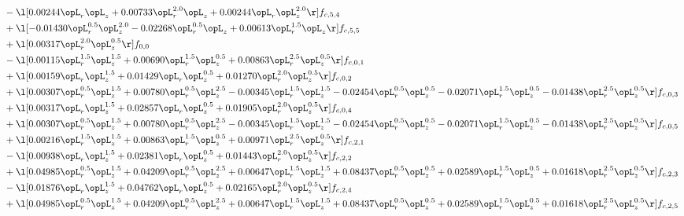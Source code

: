 \begin{alignat}{2}
& - \l[  0.00244 \opL_r \opL_z +  0.00733 \opL_r^{2.0} \opL_z +  0.00244 \opL_r \opL_z^{2.0}  \r] f_{c,5,4} \nonumber \\ 
& + \l[  -0.01430 \opL_r^{0.5} \opL_z^{2.0}   -0.02268 \opL_r^{0.5} \opL_z +  0.00613 \opL_r^{1.5} \opL_z  \r] f_{c,5,5} \nonumber \\ 
& + \l[  0.00317 \opL_r^{2.0} \opL_z^{0.5}  \r] f_{0,0} \nonumber \\ 
& - \l[  0.00115 \opL_r^{1.5} \opL_z^{1.5} +  0.00690 \opL_r^{1.5} \opL_z^{0.5} +  0.00863 \opL_r^{2.5} \opL_z^{0.5}  \r] f_{c,0,1} \nonumber \\ 
& + \l[  0.00159 \opL_r \opL_z^{1.5} +  0.01429 \opL_r \opL_z^{0.5} +  0.01270 \opL_r^{2.0} \opL_z^{0.5}  \r] f_{c,0,2} \nonumber \\ 
& + \l[  0.00307 \opL_r^{0.5} \opL_z^{1.5} +  0.00780 \opL_r^{0.5} \opL_z^{2.5}   -0.00345 \opL_r^{1.5} \opL_z^{1.5}   -0.02454 \opL_r^{0.5} \opL_z^{0.5}   -0.02071 \opL_r^{1.5} \opL_z^{0.5}   -0.01438 \opL_r^{2.5} \opL_z^{0.5}  \r] f_{c,0,3} \nonumber \\ 
& + \l[  0.00317 \opL_r \opL_z^{1.5} +  0.02857 \opL_r \opL_z^{0.5} +  0.01905 \opL_r^{2.0} \opL_z^{0.5}  \r] f_{c,0,4} \nonumber \\ 
& + \l[  0.00307 \opL_r^{0.5} \opL_z^{1.5} +  0.00780 \opL_r^{0.5} \opL_z^{2.5}   -0.00345 \opL_r^{1.5} \opL_z^{1.5}   -0.02454 \opL_r^{0.5} \opL_z^{0.5}   -0.02071 \opL_r^{1.5} \opL_z^{0.5}   -0.01438 \opL_r^{2.5} \opL_z^{0.5}  \r] f_{c,0,5} \nonumber \\ 
& + \l[  0.00216 \opL_r^{1.5} \opL_z^{1.5} +  0.00863 \opL_r^{1.5} \opL_z^{0.5} +  0.00971 \opL_r^{2.5} \opL_z^{0.5}  \r] f_{c,2,1} \nonumber \\ 
& - \l[  0.00938 \opL_r \opL_z^{1.5} +  0.02381 \opL_r \opL_z^{0.5} +  0.01443 \opL_r^{2.0} \opL_z^{0.5}  \r] f_{c,2,2} \nonumber \\ 
& + \l[  0.04985 \opL_r^{0.5} \opL_z^{1.5} +  0.04209 \opL_r^{0.5} \opL_z^{2.5} +  0.00647 \opL_r^{1.5} \opL_z^{1.5} +  0.08437 \opL_r^{0.5} \opL_z^{0.5} +  0.02589 \opL_r^{1.5} \opL_z^{0.5} +  0.01618 \opL_r^{2.5} \opL_z^{0.5}  \r] f_{c,2,3} \nonumber \\ 
& - \l[  0.01876 \opL_r \opL_z^{1.5} +  0.04762 \opL_r \opL_z^{0.5} +  0.02165 \opL_r^{2.0} \opL_z^{0.5}  \r] f_{c,2,4} \nonumber \\ 
& + \l[  0.04985 \opL_r^{0.5} \opL_z^{1.5} +  0.04209 \opL_r^{0.5} \opL_z^{2.5} +  0.00647 \opL_r^{1.5} \opL_z^{1.5} +  0.08437 \opL_r^{0.5} \opL_z^{0.5} +  0.02589 \opL_r^{1.5} \opL_z^{0.5} +  0.01618 \opL_r^{2.5} \opL_z^{0.5}  \r] f_{c,2,5} \nonumber \\ 

\end{alignat}
